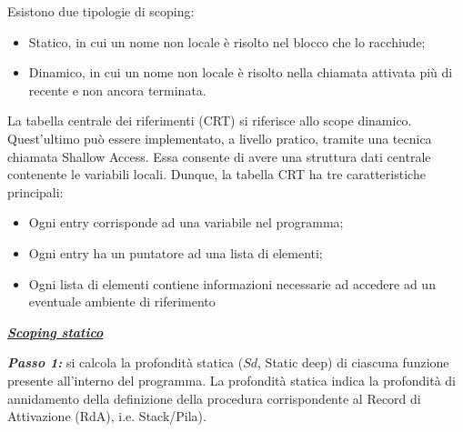 \documentclass[a4paper]{article}
\begin{document}
	\noindent
	Esistono due tipologie di scoping:
	\begin{itemize}
		\item Statico, in cui un nome non locale è risolto nel blocco che lo racchiude;
		
		\item Dinamico, in cui un nome non locale è risolto nella chiamata attivata più di recente e non ancora terminata.
	\end{itemize}
	La tabella centrale dei riferimenti (CRT) si riferisce allo scope dinamico. Quest'ultimo può essere implementato, a livello pratico, tramite una tecnica chiamata Shallow Access. Essa consente di avere una struttura dati centrale contenente le variabili locali. Dunque, la tabella CRT ha tre caratteristiche principali:
	\begin{itemize}
		\item Ogni entry corrisponde ad una variabile nel programma;
		
		\item Ogni entry ha un puntatore ad una lista di elementi;
		
		\item Ogni lista di elementi contiene informazioni necessarie ad accedere ad un eventuale ambiente di riferimento
	\end{itemize}\newpage
	
	\begin{center}
		\textbf{\emph{\underline{Scoping statico}}}
	\end{center}
	
	\noindent
	\textbf{\emph{Passo 1:}} si calcola la profondità statica ($Sd$, Static deep) di ciascuna funzione presente all'interno del programma. La profondità statica indica la profondità di annidamento della definizione della procedura corrispondente al Record di Attivazione (RdA), i.e. Stack/Pila).\newline
	
\end{document}
